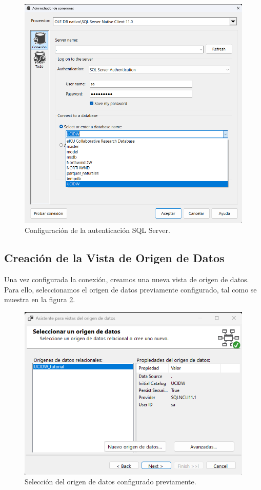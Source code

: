 \documentclass{article}
\begin{document}
\begin{figure}[H]
	\centering
	\includegraphics[width=0.7\linewidth]{images/conexion_bd.png}
	\caption{Configuración de la autenticación SQL Server.}
	\label{fig:conexion2}
\end{figure}

\subsection{Creación de la Vista de Origen de Datos}
Una vez configurada la conexión, creamos una nueva vista de origen de datos. Para ello, seleccionamos el origen de datos previamente configurado, tal como se muestra en la figura \ref{fig:origen}.

\begin{figure}[H]
	\begin{center} 
		\includegraphics[width=.7\textwidth]{images/vista1.png} 
		\caption{Selección del origen de datos configurado previamente.}
		\label{fig:origen}
	\end{center}
\end{figure}
\end{document}
